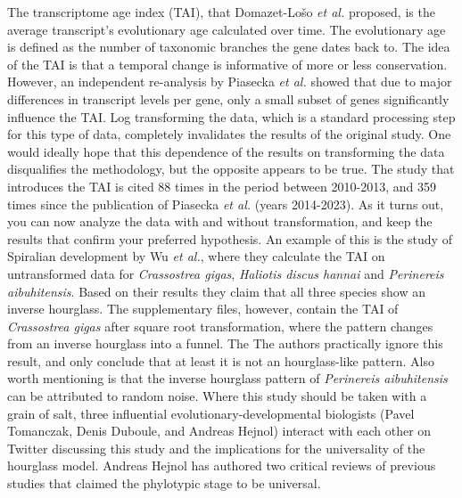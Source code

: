 The transcriptome age index (TAI), that Domazet-Lošo \textit{et al.} proposed, is the average transcript's evolutionary age calculated over time. The evolutionary age is defined as the number of taxonomic branches the gene dates back to. The idea of the TAI is that a temporal change is informative of more or less conservation. However, an independent re-analysis by Piasecka \textit{et al.} showed that due to major differences in transcript levels per gene, only a small subset of genes significantly influence the TAI\cite{Piasecka2013}. Log transforming the data, which is a standard processing step for this type of data, completely invalidates the results of the original study. One would ideally hope that this dependence of the results on transforming the data disqualifies the methodology, but the opposite appears to be true. The study that introduces the TAI is cited 88 times in the period between 2010-2013, and 359 times since the publication of Piasecka \textit{et al.} (years 2014-2023). As it turns out, you can now analyze the data with and without transformation, and keep the results that confirm your preferred hypothesis. An example of this is the study of Spiralian development by Wu \textit{et al.}\cite{Wu2019}, where they calculate the TAI on untransformed data for \textit{Crassostrea gigas}, \textit{Haliotis discus hannai} and \textit{Perinereis aibuhitensis}. Based on their results they claim that all three species show an inverse hourglass. The supplementary files, however, contain the TAI of \textit{Crassostrea gigas} after square root transformation, where the pattern changes from an inverse hourglass into a funnel. The  The authors practically ignore this result, and only conclude that at least it is not an hourglass-like pattern. Also worth mentioning is that the inverse hourglass pattern of \textit{Perinereis aibuhitensis} can be attributed to random noise. Where this study should be taken with a grain of salt, three influential evolutionary-developmental biologists (Pavel Tomanczak, Denis Duboule, and Andreas Hejnol) interact with each other on Twitter discussing this study and the implications for the universality of the hourglass model. Andreas Hejnol has authored two critical reviews of previous studies that claimed the phylotypic stage to be universal\cite{Dunn2018,hejnol2016}.

